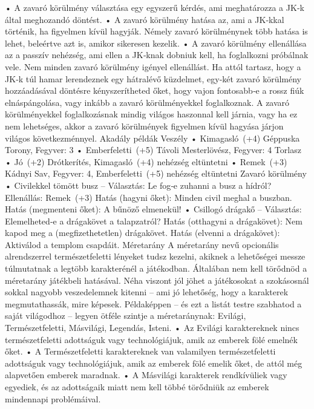 \documentclass[oneside]{book}
\begin{document}
    • A zavaró körülmény választása egy egyszerű kérdés, ami meghatározza a JK‑k által meghozandó döntést.
    • A zavaró körülmény hatása az, ami a JK‑kkal történik, ha figyelmen kívül hagyják. Némely zavaró körülménynek több hatása is lehet, beleértve azt is, amikor sikeresen kezelik.
    • A zavaró körülmény ellenállása az a passzív nehézség, ami ellen a JK‑knak dobniuk kell, ha foglalkozni próbálnak vele. Nem minden zavaró körülmény igényel ellenállást.
Ha attól tartasz, hogy a JK‑k túl hamar lerendeznek egy hátralévő küzdelmet, egy‑két zavaró körülmény hozzáadásával döntésre kényszerítheted őket, hogy vajon fontosabb‑e a rossz fiúk elnáspángolása, vagy inkább a zavaró körülményekkel foglalkoznak.
A zavaró körülményekkel foglalkozásnak mindig világos haszonnal kell járnia, vagy ha ez nem lehetséges, akkor a zavaró körülmények figyelmen kívül hagyása járjon világos következménnyel.
Akadály példák
Veszély
    • Kimagasló~(+4) Géppuska Torony, Fegyver: 3
    • Emberfeletti~(+5) Távoli Mesterlövész, Fegyver: 4
Torlasz
    • Jó~(+2) Drótkerítés, Kimagasló~(+4) nehézség eltüntetni
    • Remek~(+3) Kádnyi Sav, Fegyver: 4, Emberfeletti~(+5) nehézség eltüntetni
Zavaró körülmény
    • Civilekkel tömött busz – Választás: Le fog‑e zuhanni a busz a hídról?
Ellenállás: Remek~(+3)
Hatás (hagyni őket): Minden civil meghal a buszban.
Hatás (megmenteni őket): A bűnöző elmenekül!
    • Csillogó drágakő – Választás: Elemelheted‑e a drágakövet a talapzatról?
Hatás (otthagyni a drágakövet): Nem kapod meg a (megfizethetetlen) drágakövet.
Hatás (elvenni a drágakövet): Aktiválod a templom csapdáit.
Méretarány
A méretarány nevű opcionális alrendszerrel természetfeletti lényeket tudsz kezelni, akiknek a lehetőségei messze túlmutatnak a legtöbb karakterénél a játékodban. Általában nem kell törődnöd a méretarány játékbeli hatásával. Néha viszont jól jöhet a játékosokat a szokásosnál sokkal nagyobb veszedelemnek kitenni – ami jó lehetőség, hogy a karakterek megmutathassák, mire képesek.
Példaképpen – és ezt a listát testre szabhatod a saját világodhoz – legyen ötféle szintje a méretaránynak: Evilági, Természetfeletti, Másvilági, Legendás, Isteni.
    • Az Evilági karaktereknek nincs természetfeletti adottságuk vagy technológiájuk, amik az emberek fölé emelnék őket.
    • A Természetfeletti karaktereknek van valamilyen természetfeletti adottságuk vagy technológiájuk, amik az emberek fölé emelik őket, de attól még alapvetően emberek maradnak.
    • A Másvilági karakterek rendkívüliek vagy egyediek, és az adottságaik miatt nem kell többé törődniük az emberek mindennapi problémáival.
\end{document}
